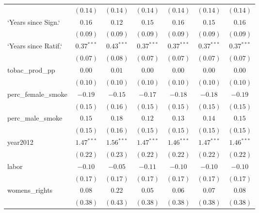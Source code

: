 \begin{table}[!h]
\begin{center}
\begin{tabular}{l c c c c c c }
                        & $(0.14)$     & $(0.14)$     & $(0.14)$     & $(0.14)$     & $(0.14)$     & $(0.14)$     \\
`Years since Sign.`     & $0.16$       & $0.12$       & $0.15$       & $0.16$       & $0.15$       & $0.16$       \\
                        & $(0.09)$     & $(0.09)$     & $(0.09)$     & $(0.09)$     & $(0.09)$     & $(0.09)$     \\
`Years since Ratif.`    & $0.37^{***}$ & $0.43^{***}$ & $0.37^{***}$ & $0.37^{***}$ & $0.37^{***}$ & $0.37^{***}$ \\
                        & $(0.07)$     & $(0.08)$     & $(0.07)$     & $(0.07)$     & $(0.07)$     & $(0.07)$     \\
tobac\_prod\_pp         & $0.00$       & $0.01$       & $0.00$       & $0.00$       & $0.00$       & $0.00$       \\
                        & $(0.10)$     & $(0.10)$     & $(0.10)$     & $(0.10)$     & $(0.10)$     & $(0.10)$     \\
perc\_female\_smoke     & $-0.19$      & $-0.15$      & $-0.17$      & $-0.18$      & $-0.18$      & $-0.19$      \\
                        & $(0.15)$     & $(0.16)$     & $(0.15)$     & $(0.15)$     & $(0.15)$     & $(0.15)$     \\
perc\_male\_smoke       & $0.15$       & $0.18$       & $0.12$       & $0.13$       & $0.14$       & $0.15$       \\
                        & $(0.15)$     & $(0.16)$     & $(0.15)$     & $(0.15)$     & $(0.15)$     & $(0.15)$     \\
year2012                & $1.47^{***}$ & $1.56^{***}$ & $1.47^{***}$ & $1.46^{***}$ & $1.47^{***}$ & $1.46^{***}$ \\
                        & $(0.22)$     & $(0.23)$     & $(0.22)$     & $(0.22)$     & $(0.22)$     & $(0.22)$     \\
labor                   & $-0.10$      & $-0.05$      & $-0.11$      & $-0.10$      & $-0.10$      & $-0.10$      \\
                        & $(0.17)$     & $(0.17)$     & $(0.17)$     & $(0.17)$     & $(0.17)$     & $(0.17)$     \\
womens\_rights          & $0.08$       & $0.22$       & $0.05$       & $0.06$       & $0.07$       & $0.08$       \\
                        & $(0.38)$     & $(0.43)$     & $(0.38)$     & $(0.38)$     & $(0.38)$     & $(0.38)$     \\

\end{tabular}
\end{center}
\end{table}
